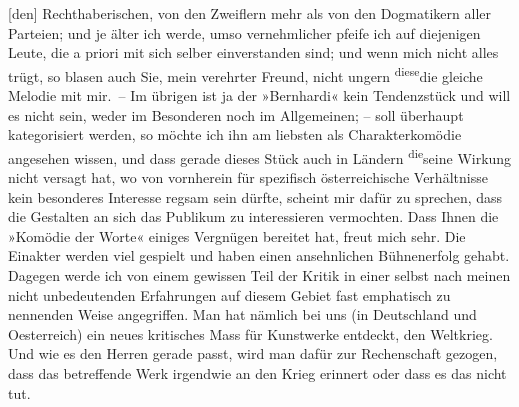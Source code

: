 \begin{ledgroupsized}[t]{13cm}
                  {[}den{]} Rechthaberischen, von den Zweiflern mehr als von den
               Dogmatikern aller Parteien\introOben{};\introOben{} und je älter ich werde, umso
               vernehmlicher pfeife ich auf diejenigen Leute, die a
               priori mit sich selber einverstanden sind; und wenn mich nicht alles trügt, so blasen
               auch Sie, mein verehrter Freund, nicht ungern \substVorne{}\textsuperscript{diese}\substDazwischen{}die gleiche\substHinten{} Melodie \introOben{}mit mir\introOben{}. – Im übrigen ist ja der »Bernhardi« kein Tendenzstück und will es nicht sein,
               weder im Besonderen noch im Allgemeinen; – soll überhaupt kategorisiert werden, so
               möchte ich ihn am liebsten als Charakterkomödie angesehen wissen, und dass gerade
               dieses Stück auch in Ländern \substVorne{}\textsuperscript{die}\substDazwischen{}seine\substHinten{} Wirkung nicht versagt hat, wo von vornherein für spezifisch österreichische Verhältnisse kein besonderes Interesse regsam
               sein dürfte, scheint mir dafür zu sprechen, dass die Gestalten an sich das Publikum
               zu interessieren vermochten.\pend
           \pstart
           {\pb}Dass Ihnen die »Komödie der Worte« einiges Vergnügen bereitet hat, freut mich sehr. Die
               Einakter werden viel gespielt und haben einen ansehnlichen Bühnenerfolg gehabt.
               Dagegen werde ich von einem gewissen Teil der Kritik in einer selbst nach meinen
               nicht unbedeutenden Erfahrungen auf diesem Gebiet fast emphatisch zu nennenden Weise
               angegriffen. Man hat nämlich bei uns (in Deutschland
               und Oesterreich) ein neues kritisches Mass für
               Kunstwerke entdeckt,  den Weltkrieg. Und wie
               es den Herren gerade passt, wird man dafür zur Rechenschaft gezogen, dass das
               betreffende Werk irgendwie an den Krieg erinnert oder dass es das nicht tut.

\end{ledgroupsized}
